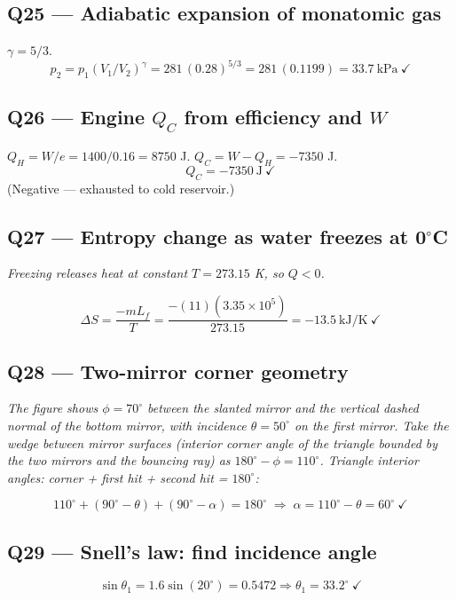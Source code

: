\documentclass[11pt]{article}
\newcommand{\checkmk}{\ensuremath{\checkmark}}
\begin{document}
\subsection*{Q25 --- Adiabatic expansion of monatomic gas}
\(\gamma = 5/3\).
\[p_2 = p_1(V_1/V_2)^\gamma = 281\,(0.28)^{5/3} = 281\,(0.1199) = \boxed{33.7\ \mathrm{kPa}}\ \checkmk\]

\subsection*{Q26 --- Engine \(Q_C\) from efficiency and \(W\)}
\(Q_H = W/e = 1400/0.16 = 8750\) J. \(Q_C = W - Q_H = -7350\) J.
\[\boxed{Q_C = -7350\ \mathrm{J}}\ \checkmk\]
(Negative --- exhausted to cold reservoir.)

\subsection*{Q27 --- Entropy change as water freezes at 0\(^\circ\)C}
\emph{Freezing releases heat at constant \(T = 273.15\) K, so \(Q < 0\).}

\[\Delta S = \frac{-mL_f}{T} = \frac{-(11)(3.35\times 10^5)}{273.15} = \boxed{-13.5\ \mathrm{kJ/K}}\ \checkmk\]

\subsection*{Q28 --- Two-mirror corner geometry}
\emph{The figure shows \(\phi=70^\circ\) between the slanted mirror and the vertical dashed normal of the bottom mirror, with incidence \(\theta=50^\circ\) on the first mirror. Take the wedge between mirror surfaces (interior corner angle of the triangle bounded by the two mirrors and the bouncing ray) as \(180^\circ - \phi = 110^\circ\). Triangle interior angles: corner + first hit + second hit = \(180^\circ\):}

\[110^\circ + (90^\circ-\theta) + (90^\circ-\alpha) = 180^\circ \;\Rightarrow\; \alpha = 110^\circ - \theta = \boxed{60^\circ}\ \checkmk\]

\subsection*{Q29 --- Snell's law: find incidence angle}
\[\sin\theta_1 = 1.6\sin(20^\circ) = 0.5472 \Rightarrow \theta_1 = \boxed{33.2^\circ}\ \checkmk\]
\end{document}

